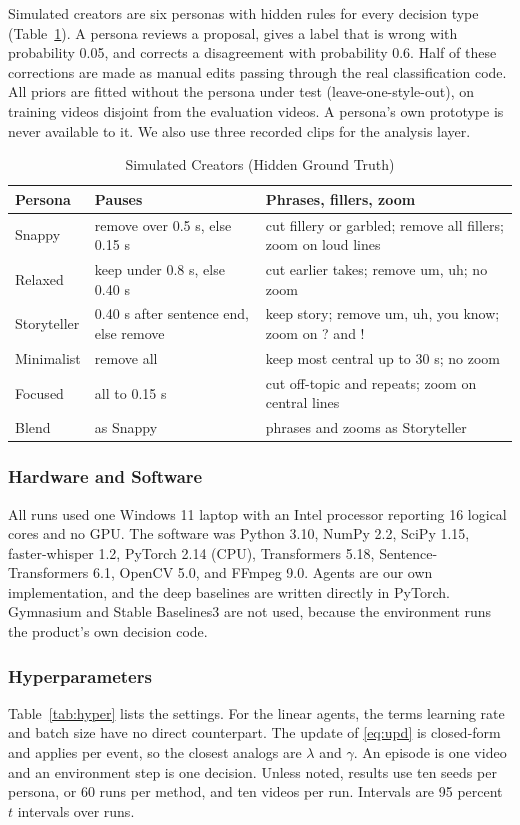 \documentclass{ieeeaccess}
\begin{document}
Simulated creators are six personas with hidden rules for every decision type (Table~\ref{tab:personas}). A persona reviews a proposal, gives a label that is wrong with probability 0.05, and corrects a disagreement with probability 0.6. Half of these corrections are made as manual edits passing through the real classification code. All priors are fitted without the persona under test (leave-one-style-out), on training videos disjoint from the evaluation videos. A persona's own prototype is never available to it. We also use three recorded clips for the analysis layer.

\begin{table}[t]
\caption{Simulated Creators (Hidden Ground Truth)}
\label{tab:personas}
\setlength{\tabcolsep}{2.5pt}
\centering
\begin{tabular}{|p{14mm}|p{32mm}|p{31mm}|}
\hline
Persona & Pauses & Phrases, fillers, zoom \\
\hline
Snappy & remove over 0.5 s, else 0.15 s & cut fillery or garbled; remove all fillers; zoom on loud lines \\
Relaxed & keep under 0.8 s, else 0.40 s & cut earlier takes; remove um, uh; no zoom \\
Storyteller & 0.40 s after sentence end, else remove & keep story; remove um, uh, you know; zoom on ? and ! \\
Minimalist & remove all & keep most central up to 30 s; no zoom \\
Focused & all to 0.15 s & cut off-topic and repeats; zoom on central lines \\
Blend & as Snappy & phrases and zooms as Storyteller \\
\hline
\end{tabular}
\end{table}

\subsubsection{Hardware and Software}
All runs used one Windows 11 laptop with an Intel processor reporting 16 logical cores and no GPU. The software was Python 3.10, NumPy 2.2, SciPy 1.15, faster-whisper 1.2, PyTorch 2.14 (CPU), Transformers 5.18, Sentence-Transformers 6.1, OpenCV 5.0, and FFmpeg 9.0. Agents are our own implementation, and the deep baselines are written directly in PyTorch. Gymnasium and Stable Baselines3 are not used, because the environment runs the product's own decision code.

\subsubsection{Hyperparameters}
Table~\ref{tab:hyper} lists the settings. For the linear agents, the terms learning rate and batch size have no direct counterpart. The update of \eqref{eq:upd} is closed-form and applies per event, so the closest analogs are $\lambda$ and $\gamma$. An episode is one video and an environment step is one decision. Unless noted, results use ten seeds per persona, or 60 runs per method, and ten videos per run. Intervals are 95 percent $t$ intervals over runs.
\end{document}
